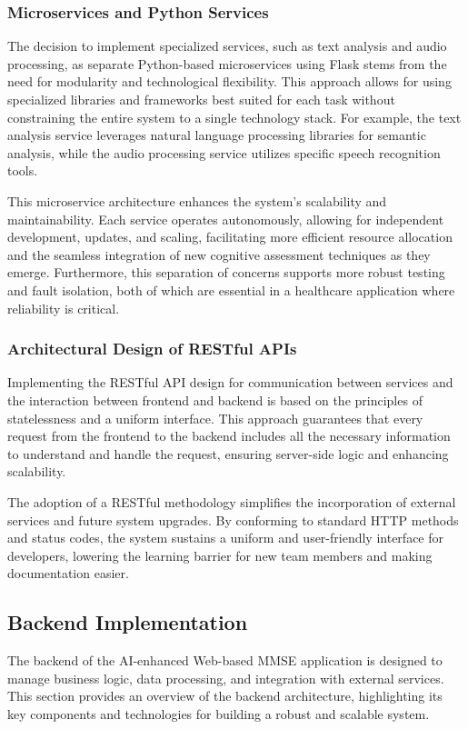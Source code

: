 \subsubsection{Microservices and Python Services}
The decision to implement specialized services, such as text analysis and audio processing, as separate Python-based microservices using Flask stems from the need for modularity and technological flexibility. This approach allows for using specialized libraries and frameworks best suited for each task without constraining the entire system to a single technology stack. For example, the text analysis service leverages natural language processing libraries for semantic analysis, while the audio processing service utilizes specific speech recognition tools.

This microservice architecture enhances the system's scalability and maintainability. Each service operates autonomously, allowing for independent development, updates, and scaling, facilitating more efficient resource allocation and the seamless integration of new cognitive assessment techniques as they emerge. Furthermore, this separation of concerns supports more robust testing and fault isolation, both of which are essential in a healthcare application where reliability is critical.

\subsubsection{Architectural Design of RESTful APIs}
Implementing the RESTful API design for communication between services and the interaction between frontend and backend is based on the principles of statelessness and a uniform interface. This approach guarantees that every request from the frontend to the backend includes all the necessary information to understand and handle the request, ensuring server-side logic and enhancing scalability.

The adoption of a RESTful methodology simplifies the incorporation of external services and future system upgrades. By conforming to standard HTTP methods and status codes, the system sustains a uniform and user-friendly interface for developers, lowering the learning barrier for new team members and making documentation easier.

\subsection{Backend Implementation}
The backend of the AI-enhanced Web-based MMSE application is designed to manage business logic, data processing, and integration with external services. This section provides an overview of the backend architecture, highlighting its key components and technologies for building a robust and scalable system.

